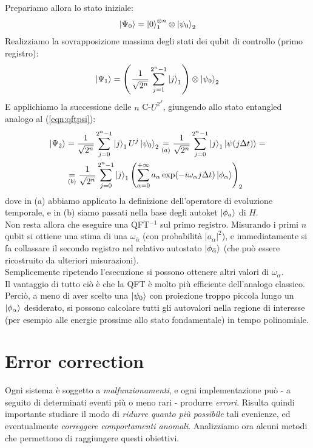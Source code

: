 \documentclass[../../InformazioneQuantistica.tex]{subfiles}
\begin{document}
Prepariamo allora lo stato iniziale:
\begin{align*}
    \Ket{\Psi_0} = \Ket{0}^{\otimes n}_1 \otimes \Ket{\psi_0}_2
\end{align*}
Realizziamo la sovrapposizione massima degli stati dei qubit di controllo (primo registro):
\begin{align*}
    \Ket{\Psi_1} = \left(\frac{1}{\sqrt{2^n}} \sum_{j=1}^{2^n-1} \Ket{j}_1 \right) \otimes \Ket{\psi_0}_2
\end{align*}
E applichiamo la successione delle $n$ C-$U^{2^J}$, giungendo allo stato entangled analogo al (\ref{eqn:qftpsi}):
\begin{align*}
    \Ket{\Psi_2} &= \frac{1}{\sqrt{2^n}} \sum_{j=0}^{2^n-1} \Ket{j}_1 U^j \Ket{\psi_0}_2 \underset{(a)}{=} \frac{1}{\sqrt{2^n}} \sum_{j=0}^{2^n-1} \Ket{j}_1 \Ket{\psi(j\Delta t)} =\\
    &\underset{(b)}{=} \frac{1}{\sqrt{2^n}}\sum_{j=0}^{2^n-1} \Ket{j}_1 \left( \sum_{\alpha=0}^{+\infty} a_\alpha \exp(-i\omega_\alpha j \Delta t) \Ket{\phi_\alpha} \right)_2
\end{align*}
dove in (a) abbiamo applicato la definizione dell'operatore di evoluzione temporale, e in (b) siamo passati nella base degli autoket $\Ket{\phi_a}$ di $H$.\\
Non resta allora che eseguire una QFT$^{-1}$ sul primo registro. Misurando i primi $n$ qubit si ottiene una stima di una $\omega_{\bar{\alpha}}$ (con probabilità $|a_\alpha|^2$), e immediatamente si fa collassare il secondo registro nel relativo autostato $\Ket{\phi_{\bar{\alpha}}}$ (che può essere ricostruito da ulteriori misurazioni).\\
Semplicemente ripetendo l'esecuzione si possono ottenere altri valori di $\omega_\alpha$.\\
Il vantaggio di tutto ciò è che la QFT è molto più efficiente dell'analogo classico. Perciò, a meno di aver scelto una $\Ket{\psi_0}$ con proiezione troppo piccola lungo un $\Ket{\phi_\alpha}$ desiderato, si possono calcolare tutti gli autovalori nella regione di interesse (per esempio alle energie prossime allo stato fondamentale) in tempo polinomiale.

\section{Error correction}
Ogni sistema è soggetto a \textit{malfunzionamenti}, e ogni implementazione può - a seguito di determinati eventi più o meno rari - produrre \textit{errori}. Risulta quindi importante studiare il modo di \textit{ridurre quanto più possibile} tali evenienze, ed eventualmente \textit{correggere comportamenti anomali}. Analizziamo ora alcuni metodi che permettono di raggiungere questi obiettivi.
\end{document}
